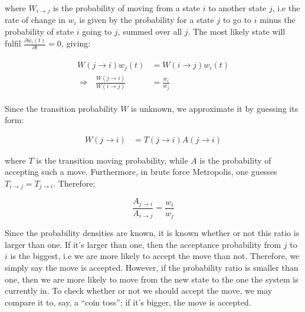 \documentclass[english, a4paper]{article}
\begin{document}
where $W_{i\rightarrow j}$ is the probability of moving from a state $i$ to another state $j$, i.e the rate of change in $w_i$ is given by the probability for a state $j$ to go to $i$ minus the
probability of state $i$ going to $j$, summed over all $j$.
The most likely state will fulfil $\frac{\partial w_i(t)}{\partial t} = 0$, giving:

\begin{align}
\begin{split}
  W(j\rightarrow i)w_j(t) &=  W(i\rightarrow j)w_i(t)\\
 \Rightarrow\:\:\:\frac{  W(j\rightarrow i)}{  W(i\rightarrow j)} &= \frac{w_i}{w_j}
\end{split}
\end{align}

Since the transition probability $W$ is unknown, we approximate it by guessing its form:

\begin{align}
 W(j\rightarrow i) &= T(j\rightarrow i) A(j\rightarrow i)
\end{align}

where $T$ is the transition moving probability, while $A$ is the probability of accepting such a move. Furthermore, in brute force Metropolis, one guesses $T_{i\rightarrow j} = T_{j\rightarrow i}$.
Therefore:

\begin{equation}
 \frac{A_{j\rightarrow i}}{A_{i\rightarrow j}} = \frac{w_i}{w_j}
\end{equation}

Since the probability densities are known, it is known whether or not this ratio is larger than one. If it's larger than one, then the acceptance probability from $j$ to $i$ is the biggest, i.e we are more likely to accept the move than not.
Therefore, we simply say the move is accepted. However, if the probability ratio is smaller than one, then we are more likely to move from the new state to the one the system is currently in.
To check whether or not we should accept the move, we may compare it to, say, a ``coin toss''; if it's bigger, the move is accepted.
\end{document}
